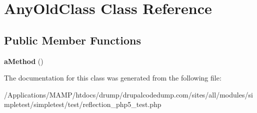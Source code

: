 \hypertarget{class_any_old_class}{
\section{AnyOldClass Class Reference}
\label{class_any_old_class}
}
\subsection*{Public Member Functions}
\begin{DoxyCompactItemize}
\item 
\hypertarget{class_any_old_class_a303b2a3cab820b348b7a1fc724f802c8}{
{\bfseries aMethod} ()}
\label{class_any_old_class_a303b2a3cab820b348b7a1fc724f802c8}

\end{DoxyCompactItemize}


The documentation for this class was generated from the following file:\begin{DoxyCompactItemize}
\item 
/Applications/MAMP/htdocs/drump/drupalcodedump.com/sites/all/modules/simpletest/simpletest/test/reflection\_\-php5\_\-test.php\end{DoxyCompactItemize}
